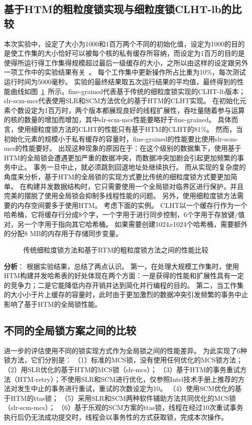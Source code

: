 \subsection{基于HTM的粗粒度锁实现与细粒度锁CLHT-lb的比较}
本次实验中，设定了大小为1000和1百万两个不同的初始化值，设定为1000的目的是使工作集的大小恰好可以被每个核的私有缓存所容纳，而设定为1百万的目的是使得所运行得工作集得规模超过最后一级缓存的大小，之所以由这样的设定跟另外一项工作中的实验结果有关~\cite{}。
每个工作集中更新操作所占比重为10\%，每次测试运行时间为5000毫秒。
实验的最终结果取五次运行结果的平均值，最终得到的性能曲线如图~\ref{fig:htm_coarse_grained}~所示。fine-grained代表基于传统的细粒度锁实现的CLHT-lb版本；slr-scm-mcs代表使用SLR和SCM方法优化的基于HTM的CLHT实现。
在初始化元素个数设定为1百万时，两个版本都展现良好的线程扩展性，吞吐量随着参与运算的核的数量的增加而增加，其中slr-scm-mcs性能要略好于fine-grained。
具体而言，使用细粒度锁方法的CLHT的性能只有基于HTM的CLHT的81\%。
然而，当初始化元素的规模小于私有缓存的容量时，fine-grained的性能要比使用slr-scm-mcs的性能要好。
出现这种现象的原因在于：在这个级别的数据集下，使用基于HTM的全局锁会遭遇更加严重的数据冲突，而数据冲突加剧会引起更加频繁的事务中止。
事务一旦中止，就必须跳到回退地址处继续执行。
而从实现的复杂度的角度来分析，基于HTM的全局锁的实现方式要比传统的细粒度锁方式要更加简单。
在构建并发数据结构时，它只需要使用一个全局锁对临界区进行保护，并且完美的摆脱了使用全局锁会抑制多线程性能的问题。
另外，使用细粒度锁方法需要的内存空间要多于使用HTM。
考虑下面的实例。
CLHT以一个缓存行作为一个哈希桶，它将缓存行分成8个字，一个字用于进行同步控制，6个字用于存放键/值对，另一个字用于指向其它哈希桶。
如果需要创建1024$x$1024个哈希桶，需要额外的分配8 MB的内存用于存储同步变量。

\begin{figure}[htbp]
\centering
\caption{传统细粒度锁方法和基于RTM的粗粒度锁方法之间的性能比较}
\label{fig:htm_coarse_grained}
\end{figure}

\textbf{分析}： 根据实验结果，总结了两点认识。
第一，在处理大规模工作集时，使用HTM构建并发哈希表的好处体现在两个方面：一是获得的性能和扩展性具有一定的竞争力；二是它能降低内存开销并达到简化并行编程的目的。
第二，当工作集的大小小于片上缓存的容量时，此时由于更加激烈的数据冲突引发频繁的事务中止影响了基于HTM的全局锁性能。

\subsection{不同的全局锁方案之间的比较}
\label{sec:htm_global}
进一步的评估使用不同的锁实现方式作为全局锁之间的性能差异。
为此实现了6种锁方法，它们分别是：
（1）标准的MCS锁，没有使用任何优化的MCS锁方法；
（2）用SLR优化的基于HTM的MCS锁（slr-mcs）；
（3）基于HTM的事务重试方法（HTM-retry）；不使用SLR和SCM进行优化，仅参照Intel技术手册上推荐的方法对发生中止的事务进行重试，重试的次数设定为10。
（4）使用SCM优化的基于HTM的ttas锁；
（5）采用SLR和SCM两种软件辅助方法共同优化的MCS锁（slr-scm-mcs）；
（6）基于乐观的SCM方案的ttas锁，线程在经过10次重试事务执行后仍无法成功提交时，线程会以事务性的方式获取锁，完成本次操作。

